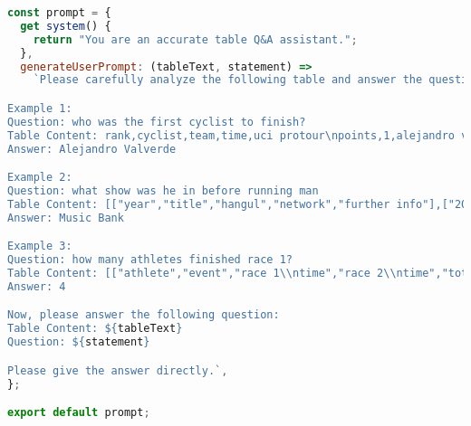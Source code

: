 \documentclass[12pt,a4paper]{ctexart}
\begin{document}
\begin{lstlisting}[language=JavaScript]
const prompt = {
  get system() {
    return "You are an accurate table Q&A assistant.";
  },
  generateUserPrompt: (tableText, statement) =>
    `Please carefully analyze the following table and answer the questions accurately. Note: Only output the answers, do not explain the process.

Example 1:
Question: who was the first cyclist to finish?
Table Content: rank,cyclist,team,time,uci protour\npoints,1,alejandro valverde (esp),caisse d'epargne,5h 29' 10",40,2,alexandr kolobnev (rus),team csc saxo bank,s.t.,30,3,davide rebellin (ita),gerolsteiner,s.t.,25,4,paolo bettini (ita),quick step,s.t.,20,5,franco pellizotti (ita),liquigas,s.t.,15,6,denis menchov (rus),rabobank,s.t.,11,7,samuel sánchez (esp),euskaltel-euskadi,s.t.,7,8,stéphane goubert (fra),ag2r-la mondiale,+ 2",5,9,haimar zubeldia (esp),euskaltel-euskadi,+ 2",3,10,david moncoutié (fra),cofidis,+ 2",1
Answer: Alejandro Valverde

Example 2:
Question: what show was he in before running man
Table Content: [["year","title","hangul","network","further info"],["2008","pretty boys: a wrong situation","꽃미남 아롱사태","mnet",""],["2009","let's go dream team! season 2","출발 드림팀2","kbs2","variety show"],["2009-10","music bank","뮤직뱅크","kbs2","music show, as mc"],["2010-11","running man","런닝맨","sbs","variety show"],["2011","i'm real: song joong-ki","i'm real 송중기","qtv",""],["2011","everyone dramatic","에브리원 드라마틱","mbc",""],["2011","made in u","메이드 인 유","jtbc","audition show, as mc"],["2011-12","tears of the antarctic","남극의 눈물","mbc","documentary, as narrator"]]
Answer: Music Bank

Example 3:
Question: how many athletes finished race 1?
Table Content: [["athlete","event","race 1\\ntime","race 2\\ntime","total\\ntime","total\\nrank"],["jóhann haraldsson","giant slalom","1:19.10","dnf","dnf","–"],["kristinn magnússon","giant slalom","1:17.50","1:16.29","2:33.79","42"],["björgvin björgvinsson","giant slalom","1:15.86","dnf","dnf","–"],["kristinn magnússon","slalom","dnf","–","dnf","–"],["björgvin björgvinsson","slalom","dnf","–","dnf","–"],["jóhann haraldsson","slalom","56.98","1:00.19","1:57.17","28"],["kristinn björnsson","slalom","53.05","56.76","1:49.81","21"]]
Answer: 4

Now, please answer the following question:
Table Content: ${tableText}
Question: ${statement}

Please give the answer directly.`,
};

export default prompt;
\end{lstlisting}
\end{document}
